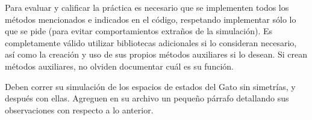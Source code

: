 Para evaluar y calificar la práctica es necesario que se implementen todos los métodos mencionados e indicados en el código, respetando implementar sólo lo que se pide (para evitar comportamientos extraños de la simulación).
Es completamente válido utilizar bibliotecas adicionales si lo consideran necesario, así como la creación y uso de sus propios métodos auxiliares si lo desean. Si crean métodos auxiliares, no olviden documentar cuál es su función.

Deben correr su simulación de los espacios de estados del Gato sin simetrías, y después con ellas. Agreguen en su archivo  un pequeño párrafo detallando sus observaciones con respecto a lo anterior.


